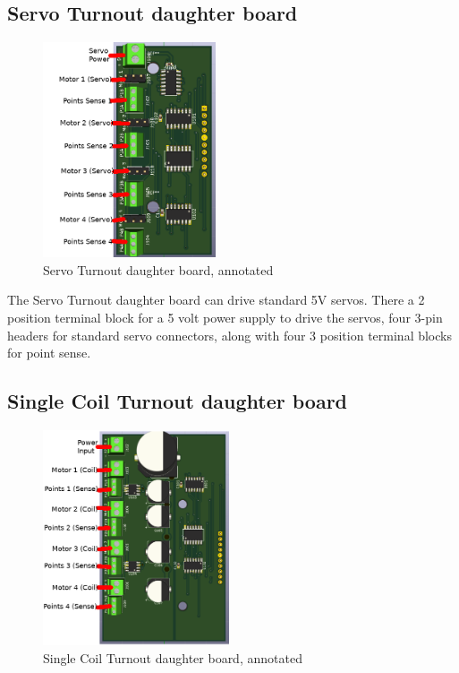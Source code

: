\subsection{Servo Turnout daughter board}
\label{sect:TS-Daughter}
\begin{figure}[hbpt]\begin{centering}%
\includegraphics[height=2.5in]{TS-DaughterBoard-Annotated.png}
\caption{Servo Turnout daughter board, annotated}
\end{centering}\end{figure}

The Servo Turnout daughter board can drive standard 5V servos. There a 2
position terminal block for a 5 volt power supply to drive the servos, four
3-pin headers for standard servo connectors, along with four 3 position
terminal blocks for point sense.

\subsection{Single Coil Turnout daughter board}
\label{sect:SC-Daughter}
\begin{figure}[hbpt]\begin{centering}%
\includegraphics[height=2.5in]{SC-DaughterBoard-Annotated.png}
\caption{Single Coil Turnout daughter board, annotated}
\end{centering}\end{figure}

